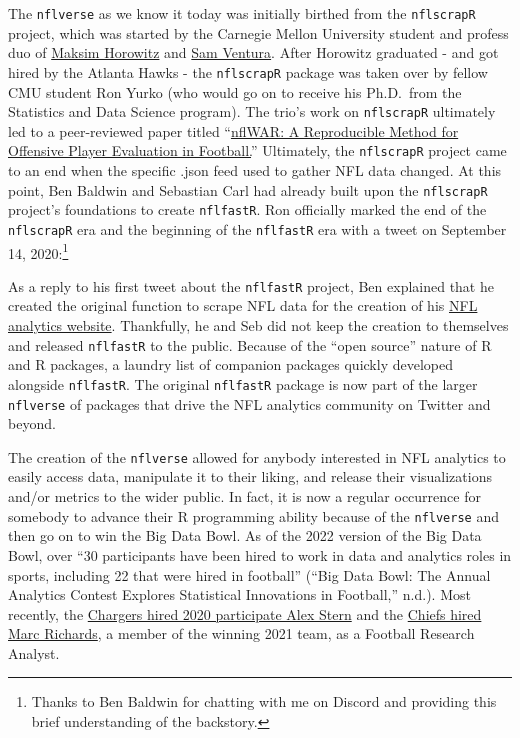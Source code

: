 \documentclass[
  letterpaper,
]{krantz}
\begin{document}
The \texttt{nflverse} as we know it today was initially birthed from the
\texttt{nflscrapR} project, which was started by the Carnegie Mellon
University student and profess duo of
\href{https://twitter.com/bklynmaks?lang=en}{Maksim Horowitz} and
\href{https://twitter.com/stat_sam}{Sam Ventura}. After Horowitz
graduated - and got hired by the Atlanta Hawks - the \texttt{nflscrapR}
package was taken over by fellow CMU student Ron Yurko (who would go on
to receive his Ph.D.~from the Statistics and Data Science program). The
trio's work on \texttt{nflscrapR} ultimately led to a peer-reviewed
paper titled ``\href{https://arxiv.org/pdf/1802.00998.pdf}{nflWAR: A
Reproducible Method for Offensive Player Evaluation in Football.}''
Ultimately, the \texttt{nflscrapR} project came to an end when the
specific .json feed used to gather NFL data changed. At this point, Ben
Baldwin and Sebastian Carl had already built upon the \texttt{nflscrapR}
project's foundations to create \texttt{nflfastR}. Ron officially marked
the end of the \texttt{nflscrapR} era and the beginning of the
\texttt{nflfastR} era with a tweet on September 14, 2020:\footnote{Thanks
  to Ben Baldwin for chatting with me on Discord and providing this
  brief understanding of the backstory.}

As a reply to his first tweet about the \texttt{nflfastR} project, Ben
explained that he created the original function to scrape NFL data for
the creation of his \href{https://rbsdm.com/stats/stats/}{NFL analytics
website}. Thankfully, he and Seb did not keep the creation to themselves
and released \texttt{nflfastR} to the public. Because of the ``open
source'' nature of R and R packages, a laundry list of companion
packages quickly developed alongside \texttt{nflfastR}. The original
\texttt{nflfastR} package is now part of the larger \texttt{nflverse} of
packages that drive the NFL analytics community on Twitter and beyond.

The creation of the \texttt{nflverse} allowed for anybody interested in
NFL analytics to easily access data, manipulate it to their liking, and
release their visualizations and/or metrics to the wider public. In
fact, it is now a regular occurrence for somebody to advance their R
programming ability because of the \texttt{nflverse} and then go on to
win the Big Data Bowl. As of the 2022 version of the Big Data Bowl, over
``30 participants have been hired to work in data and analytics roles in
sports, including 22 that were hired in football'' ({``Big Data Bowl:
The Annual Analytics Contest Explores Statistical Innovations in
Football,''} n.d.). Most recently, the
\href{https://www.boltsfromtheblue.com/2021/7/9/22570490/chargers-news-nfl-big-data-bowl}{Chargers
hired 2020 participate Alex Stern} and the
\href{https://twitter.com/sethwalder/status/1532721476209627136}{Chiefs
hired Marc Richards}, a member of the winning 2021 team, as a Football
Research Analyst.
\end{document}
